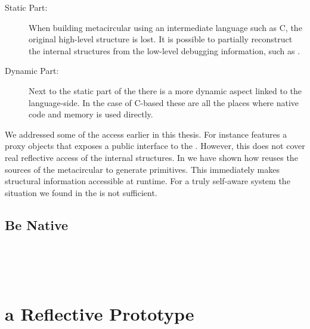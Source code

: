 \begin{description}
	\item[Static Part:] 
	When building metacircular \VMs using an intermediate language such as C, the original high-level structure is lost.
	It is possible to partially reconstruct the internal structures from the low-level debugging information, such as \Dwarf.
	
	\item[Dynamic Part:]
	Next to the static part of the \VM there is a more dynamic aspect linked to the language-side.
	In the case of C-based \VM these are all the places where native code and memory is used directly.
\end{description}

We addressed some of the access earlier in this thesis.
For instance \NB features a \VM proxy objects that exposes a public interface to the \VM.
However, this does not cover real reflective access of the \VM internal structures.
In  we have shown how \WF reuses the sources of the metacircular \VM to generate primitives.
This immediately makes structural information accessible at runtime.
For a truly self-aware system the situation we found in the \PH \VM is not sufficient.

\subsection{Be Native}
\\
\\
\\


\section{\Mate a Reflective \VM Prototype}
\\

